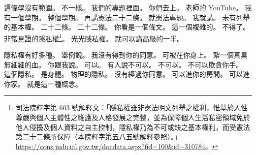 \hypertarget{c01:cue:680}{}這條學沒有範圍。
\hypertarget{c01:cue:681}{}不一樣。
\hypertarget{c01:cue:682}{}我們的專題裡面。
\hypertarget{c01:cue:683}{}你們去上。
\hypertarget{c01:cue:684}{}老師的 YouTube。
\hypertarget{c01:cue:685}{}我有一個學期。
\hypertarget{c01:cue:686}{}整個學期。
\hypertarget{c01:cue:687}{}再講憲法二十二條。
\hypertarget{c01:cue:688}{}就憲法專題。
\hypertarget{c01:cue:689}{}我就講。
\hypertarget{c01:cue:690}{}未有列舉的基本權。
\hypertarget{c01:cue:691}{}二十二條。
\hypertarget{c01:cue:692}{}二十二條。
\hypertarget{c01:cue:693}{}你看是一個條文。
\hypertarget{c01:cue:694}{}這一個複雜的。
\hypertarget{c01:cue:695}{}不得了。
\hypertarget{c01:cue:696}{}非常見證的隱私權\footnote{司法院釋字第 603 號解釋文：「隱私權雖非憲法明文列舉之權利，惟基於人性尊嚴與個人主體性之維護及人格發展之完整，並為保障個人生活私密領域免於他人侵擾及個人資料之自主控制，隱私權乃為不可或缺之基本權利，而受憲法第二十二條所保障（本院釋字第五八五號解釋參照）。」\url{https://cons.judicial.gov.tw/docdata.aspx?fid=100&id=310784}。}。
\hypertarget{c01:cue:697}{}光光隱私權。
\hypertarget{c01:cue:698}{}就可以講高級的一半。

\hypertarget{c01:cue:699}{}隱私權有好多種。
\hypertarget{c01:cue:700}{}舉例說。
\hypertarget{c01:cue:701}{}我沒有得到你的同意。
\hypertarget{c01:cue:702}{}可被在你身上。
\hypertarget{c01:cue:703}{}紮一個真臭無細細的血。
\hypertarget{c01:cue:704}{}你跟我說。
\hypertarget{c01:cue:705}{}可以。
\hypertarget{c01:cue:706}{}有人說不可以。
\hypertarget{c01:cue:707}{}不可以。
\hypertarget{c01:cue:708}{}不可以欺貪你手。
\hypertarget{c01:cue:709}{}這個隱私。
\hypertarget{c01:cue:710}{}是身體。
\hypertarget{c01:cue:711}{}物理的隱私。
\hypertarget{c01:cue:712}{}沒有經過你同意。
\hypertarget{c01:cue:713}{}可以進你的房間。
\hypertarget{c01:cue:714}{}可以進你家。
\hypertarget{c01:cue:715}{}就是這一種概念。

